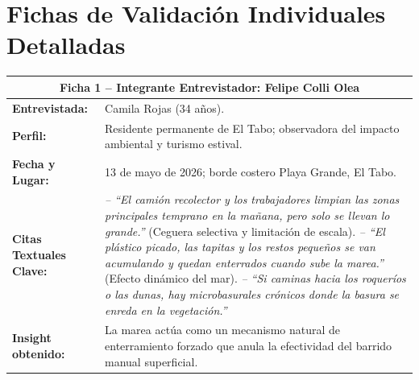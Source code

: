 \documentclass[12pt,letterpaper]{article}
\begin{document}
\section{Fichas de Validación Individuales Detalladas}
\label{anexo:fichas}

\begin{table}[h!]
\centering
\small
{}
\begin{tabularx}{\textwidth}{p{3.2cm}X}
\toprule
\multicolumn{2}{c}{\textbf{Ficha 1 -- Integrante Entrevistador: Felipe Colli Olea}} \\
\midrule
\textbf{Entrevistada:} & Camila Rojas (34 años). \\
\textbf{Perfil:} & Residente permanente de El Tabo; observadora del impacto ambiental y turismo estival. \\
\textbf{Fecha y Lugar:} & 13 de mayo de 2026; borde costero Playa Grande, El Tabo. \\
\textbf{Citas Textuales Clave:} & 
\textit{-- ``El camión recolector y los trabajadores limpian las zonas principales temprano en la mañana, pero solo se llevan lo grande.''} (Ceguera selectiva y limitación de escala).\newline
\textit{-- ``El plástico picado, las tapitas y los restos pequeños se van acumulando y quedan enterrados cuando sube la marea.''} (Efecto dinámico del mar).\newline
\textit{-- ``Si caminas hacia los roqueríos o las dunas, hay microbasurales crónicos donde la basura se enreda en la vegetación.''} \\
\textbf{Insight obtenido:} & La marea actúa como un mecanismo natural de enterramiento forzado que anula la efectividad del barrido manual superficial. \\
\bottomrule
\end{tabularx}
\end{table}
\end{document}
